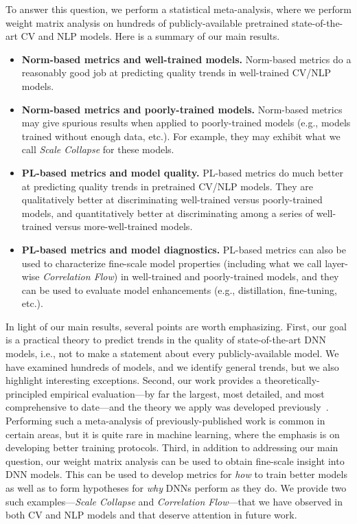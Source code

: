 To answer this question, we perform a statistical meta-analysis, where we 
perform weight matrix analysis on %
hundreds of publicly-available pretrained state-of-the-art CV and NLP models. 
Here is a summary of our main results.
\begin{itemize}
\item
\textbf{Norm-based metrics and well-trained models.}
Norm-based metrics do a reasonably good job at predicting quality trends in well-trained CV/NLP models.
\item
\textbf{Norm-based metrics and poorly-trained models.}
Norm-based metrics may give spurious results when applied to poorly-trained models (e.g., models trained without enough data, etc.).
For example, they may exhibit what we call \emph{Scale Collapse} for these models. 
\item 
\textbf{PL-based metrics and model quality.}
PL-based metrics do much better at predicting quality trends in pretrained CV/NLP models.  
They are qualitatively better at discriminating well-trained versus poorly-trained models, and quantitatively better at discriminating among a series of well-trained versus more-well-trained models.
\item 
\textbf{PL-based metrics and model diagnostics.}
PL-based metrics can also be used to characterize fine-scale model properties (including what we call layer-wise \emph{Correlation Flow}) in well-trained and poorly-trained models, and they can be used to evaluate model enhancements (e.g., distillation, fine-tuning, etc.).
\end{itemize}

\noindent
In light of our main results, several points are worth emphasizing.
First, our goal is a practical theory to predict trends in the quality of state-of-the-art DNN models, i.e., not to make a statement about every publicly-available model.
We have examined hundreds of models, and we identify general trends, but we also highlight interesting exceptions.
Second, our work provides a theoretically-principled empirical evaluation---by far the largest, most detailed, and most comprehensive to date---and the theory we apply was developed previously~\cite{MM18_TR, MM19_HTSR_ICML, MM20_SDM}.
Performing such a meta-analysis of previously-published work is common in certain areas, but it is quite rare in machine learning, where the emphasis is on developing better training protocols.
Third, in addition to addressing our main question, our weight matrix analysis can be used to obtain fine-scale insight into DNN models.
This can be used to develop metrics for \emph{how} to train better models as well as to form hypotheses for \emph{why} DNNs perform as they do.
We provide two such examples---\emph{Scale Collapse} and \emph{Correlation Flow}---that we have observed in both CV and NLP models and that deserve attention in future work.



